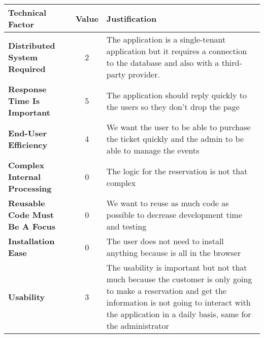 \begin{center}
    \begin{tabular}{|l | c | p{7cm}|} 
        \hline
        \textbf{Technical Factor} & \textbf{Value} & \textbf{Justification} \\ [0.5ex] 
        \hline
        \textbf{Distributed System Required} & 2 & The application is a single-tenant application but it requires a connection to the database and also with a third-party provider. \\ 
        \hline
        \textbf{Response Time Is Important} & 5 & The application should reply quickly to the users so they don't drop the page \\
        \hline
        \textbf{End-User Efficiency} & 4 & We want the user to be able to purchase the ticket quickly and the admin to be able to manage the events \\
        \hline
        \textbf{Complex Internal Processing} & 0 & The logic for the reservation is not that complex \\
        \hline
        \textbf{Reusable Code Must Be A Focus} & 0 & We want to reuse as much code as possible to decrease development time and testing \\
        \hline
        \textbf{Installation Ease} & 0 &  The user does not need to install anything because is all in the browser\\
        \hline
        \textbf{Usability} & 3 & The usability is important but not that much because the customer is only going to make a reservation and get the information is not going to interact with the application in a daily basis, same for the administrator \\
        \hline
    \end{tabular}
\end{center}

\pagebreak

